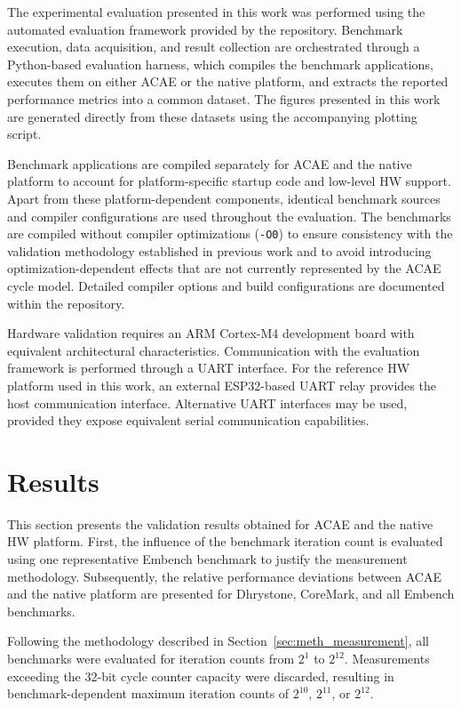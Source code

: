 \documentclass[conference]{IEEEtran}
\begin{document}
			The experimental evaluation presented in this work was performed using the automated evaluation framework provided by the repository.
			Benchmark execution, data acquisition, and result collection are orchestrated through a Python-based evaluation harness, which compiles the benchmark applications, executes them on either \ac{ACAE} or the native platform, and extracts the reported performance metrics into a common dataset.
			The figures presented in this work are generated directly from these datasets using the accompanying plotting script.
			
			Benchmark applications are compiled separately for \ac{ACAE} and the native platform to account for platform-specific startup code and low-level \ac{HW} support.
			Apart from these platform-dependent components, identical benchmark sources and compiler configurations are used throughout the evaluation.
			The benchmarks are compiled without compiler optimizations (\texttt{-O0}) to ensure consistency with the validation methodology established in previous work and to avoid introducing optimization-dependent effects that are not currently represented by the \ac{ACAE} cycle model.
			Detailed compiler options and build configurations are documented within the repository.
			
			Hardware validation requires an ARM Cortex-M4 development board with equivalent architectural characteristics.
			Communication with the evaluation framework is performed through a \ac{UART} interface.
			For the reference \ac{HW} platform used in this work, an external ESP32-based \ac{UART} relay provides the host communication interface.
			Alternative \ac{UART} interfaces may be used, provided they expose equivalent serial communication capabilities.
	
	\section{Results}
		\label{sec:results}
		This section presents the validation results obtained for \ac{ACAE} and the native \ac{HW} platform.
		First, the influence of the benchmark iteration count is evaluated using one representative Embench benchmark to justify the measurement methodology.
		Subsequently, the relative performance deviations between \ac{ACAE} and the native platform are presented for Dhrystone, CoreMark, and all Embench benchmarks.

		Following the methodology described in Section~\ref{sec:meth_measurement}, all benchmarks were evaluated for iteration counts from $2^{1}$ to $2^{12}$.
		Measurements exceeding the 32-bit cycle counter capacity were discarded, resulting in benchmark-dependent maximum iteration counts of $2^{10}$, $2^{11}$, or $2^{12}$.
\end{document}
